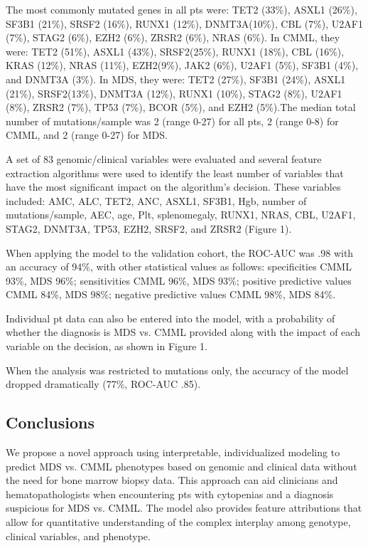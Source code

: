 The most commonly mutated genes in all pts were: TET2 (33\%), ASXL1 (26\%), SF3B1 (21\%), SRSF2 (16\%), RUNX1 (12\%), DNMT3A(10\%), CBL (7\%), U2AF1 (7\%), STAG2 (6\%), EZH2 (6\%), ZRSR2 (6\%), NRAS (6\%). In CMML, they were: TET2 (51\%), ASXL1 (43\%), SRSF2(25\%), RUNX1 (18\%), CBL (16\%), KRAS (12\%), NRAS (11\%), EZH2(9\%), JAK2 (6\%), U2AF1 (5\%), SF3B1 (4\%), and DNMT3A (3\%). In MDS, they were: TET2 (27\%), SF3B1 (24\%), ASXL1 (21\%), SRSF2(13\%), DNMT3A (12\%), RUNX1 (10\%), STAG2 (8\%), U2AF1 (8\%), ZRSR2 (7\%), TP53 (7\%), BCOR (5\%), and EZH2 (5\%).The median total number of mutations/sample was 2 (range 0-27) for all pts, 2 (range 0-8) for CMML, and 2 (range 0-27) for MDS.

A set of 83 genomic/clinical variables were evaluated and several feature extraction algorithms were used to identify the least number of variables that have the most significant impact on the algorithm's decision. These variables included: AMC, ALC, TET2, ANC, ASXL1, SF3B1, Hgb, number of mutations/sample, AEC, age, Plt, splenomegaly, RUNX1, NRAS, CBL, U2AF1, STAG2, DNMT3A, TP53, EZH2, SRSF2, and ZRSR2 (Figure 1).

When applying the model to the validation cohort, the ROC-AUC was .98 with an accuracy of 94\%, with other statistical values as follows: specificities CMML 93\%, MDS 96\%; sensitivities CMML 96\%, MDS 93\%; positive predictive values CMML 84\%, MDS 98\%; negative predictive values CMML 98\%, MDS 84\%.

Individual pt data can also be entered into the model, with a probability of whether the diagnosis is MDS vs. CMML provided along with the impact of each variable on the decision, as shown in Figure 1.

When the analysis was restricted to mutations only, the accuracy of the model dropped dramatically (77\%, ROC-AUC .85).


\subsection{Conclusions}%

We propose a novel approach using interpretable, individualized modeling to predict MDS vs. CMML phenotypes based on genomic and clinical data without the need for bone marrow biopsy data. This approach can aid clinicians and hematopathologists when encountering pts with cytopenias and a diagnosis suspicious for MDS vs. CMML. The model also provides feature attributions that allow for quantitative understanding of the complex interplay among genotype, clinical variables, and phenotype.



